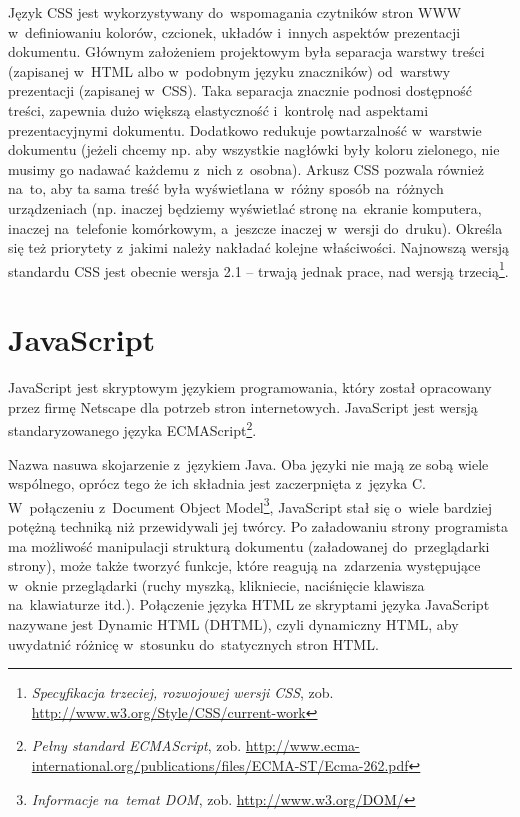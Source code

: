 \documentclass[a4paper,12pt,oneside]{report}
\begin{document}
Język CSS jest wykorzystywany do~wspomagania czytników stron WWW w~definiowaniu kolorów, czcionek, układów i~innych aspektów prezentacji dokumentu. Głównym założeniem projektowym była separacja warstwy treści (zapisanej w~HTML albo w~podobnym języku znaczników) od~warstwy prezentacji (zapisanej w~CSS). Taka separacja znacznie podnosi dostępność treści, zapewnia dużo większą elastyczność i~kontrolę nad aspektami prezentacyjnymi dokumentu. Dodatkowo redukuje powtarzalność w~warstwie dokumentu (jeżeli chcemy np. aby wszystkie nagłówki były koloru zielonego, nie musimy go nadawać każdemu z~nich z~osobna). Arkusz CSS pozwala również na~to, aby ta sama treść była wyświetlana w~różny sposób na~różnych urządzeniach (np. inaczej będziemy wyświetlać stronę na~ekranie komputera, inaczej na~telefonie komórkowym, a~jeszcze inaczej w~wersji do~druku). Określa się też priorytety z~jakimi należy nakładać kolejne właściwości. Najnowszą wersją standardu CSS jest obecnie wersja 2.1 -- trwają jednak prace, nad wersją trzecią\footnote{\emph{Specyfikacja trzeciej, rozwojowej wersji CSS}, zob. \url{http://www.w3.org/Style/CSS/current-work}}.

\section{JavaScript}
\label{sec:javascript}
JavaScript jest skryptowym językiem programowania, który został opracowany przez firmę Netscape dla potrzeb stron internetowych. JavaScript jest wersją standaryzowanego języka ECMAScript\footnote{\emph{Pełny standard ECMAScript}, zob. \url{http://www.ecma-international.org/publications/files/ECMA-ST/Ecma-262.pdf}}.

Nazwa nasuwa skojarzenie z~językiem Java. Oba języki nie mają ze sobą wiele wspólnego, oprócz tego że ich składnia jest zaczerpnięta z~języka C. W~połączeniu z~Document Object Model\footnote{\emph{Informacje na~temat DOM}, zob. \url{http://www.w3.org/DOM/}}, JavaScript stał się o~wiele bardziej potężną techniką niż przewidywali jej twórcy. Po załadowaniu strony programista ma możliwość manipulacji strukturą dokumentu (załadowanej do~przeglądarki strony), może także tworzyć funkcje, które reagują na~zdarzenia występujące w~oknie przeglądarki (ruchy myszką, klikniecie, naciśnięcie klawisza na~klawiaturze itd.). Połączenie języka HTML ze skryptami języka JavaScript nazywane jest Dynamic HTML (DHTML), czyli dynamiczny HTML, aby uwydatnić różnicę w~stosunku do~statycznych stron HTML. 
\end{document}
